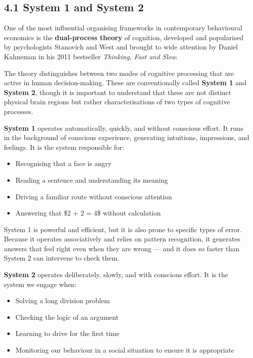 \documentclass[12pt, letterpaper]{article}
\begin{document}
\subsection{4.1 System 1 and System 2}


One of the most influential organising frameworks in contemporary behavioural economics is the \textbf{dual-process theory} of cognition, developed and popularised by psychologists Stanovich and West and brought to wide attention by Daniel Kahneman in his 2011 bestseller \textit{Thinking, Fast and Slow}.

The theory distinguishes between two modes of cognitive processing that are active in human decision-making. These are conventionally called \textbf{System 1} and \textbf{System 2}, though it is important to understand that these are not distinct physical brain regions but rather characterisations of two types of cognitive processes.

\textbf{System 1} operates automatically, quickly, and without conscious effort. It runs in the background of conscious experience, generating intuitions, impressions, and feelings. It is the system responsible for:
\begin{itemize}
\item Recognising that a face is angry
\item Reading a sentence and understanding its meaning
\item Driving a familiar route without conscious attention
\item Answering that \$2 + 2 = 4\$ without calculation
\end{itemize}

System 1 is powerful and efficient, but it is also prone to specific types of error. Because it operates associatively and relies on pattern recognition, it generates answers that feel right even when they are wrong --- and it does so faster than System 2 can intervene to check them.

\textbf{System 2} operates deliberately, slowly, and with conscious effort. It is the system we engage when:
\begin{itemize}
\item Solving a long division problem
\item Checking the logic of an argument
\item Learning to drive for the first time
\item Monitoring our behaviour in a social situation to ensure it is appropriate
\end{itemize}
\end{document}
